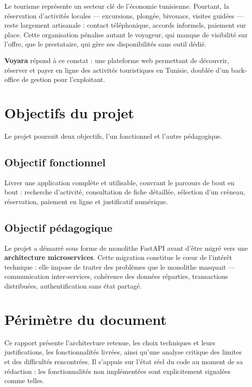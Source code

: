 \documentclass[11pt,a4paper]{report}
\begin{document}
Le tourisme représente un secteur clé de l'économie tunisienne. Pourtant, la
réservation d'activités locales — excursions, plongée, bivouacs, visites
guidées — reste largement artisanale : contact téléphonique, accords informels,
paiement sur place. Cette organisation pénalise autant le voyageur, qui manque
de visibilité sur l'offre, que le prestataire, qui gère ses disponibilités sans
outil dédié.

\textbf{Voyara} répond à ce constat : une plateforme web permettant de
découvrir, réserver et payer en ligne des activités touristiques en Tunisie,
doublée d'un back-office de gestion pour l'exploitant.

\section{Objectifs du projet}

Le projet poursuit deux objectifs, l'un fonctionnel et l'autre pédagogique.

\subsection{Objectif fonctionnel}

Livrer une application complète et utilisable, couvrant le parcours de bout en
bout : recherche d'activité, consultation de fiche détaillée, sélection d'un
créneau, réservation, paiement en ligne et justificatif numérique.

\subsection{Objectif pédagogique}

Le projet a démarré sous forme de monolithe FastAPI avant d'être migré vers une
\textbf{architecture microservices}. Cette migration constitue le cœur de
l'intérêt technique : elle impose de traiter des problèmes que le monolithe
masquait — communication inter-services, cohérence des données réparties,
transactions distribuées, authentification sans état partagé.

\section{Périmètre du document}

Ce rapport présente l'architecture retenue, les choix techniques et leurs
justifications, les fonctionnalités livrées, ainsi qu'une analyse critique des
limites et des difficultés rencontrées. Il s'appuie sur l'état réel du code au
moment de sa rédaction : les fonctionnalités non implémentées sont explicitement
signalées comme telles.
\end{document}
